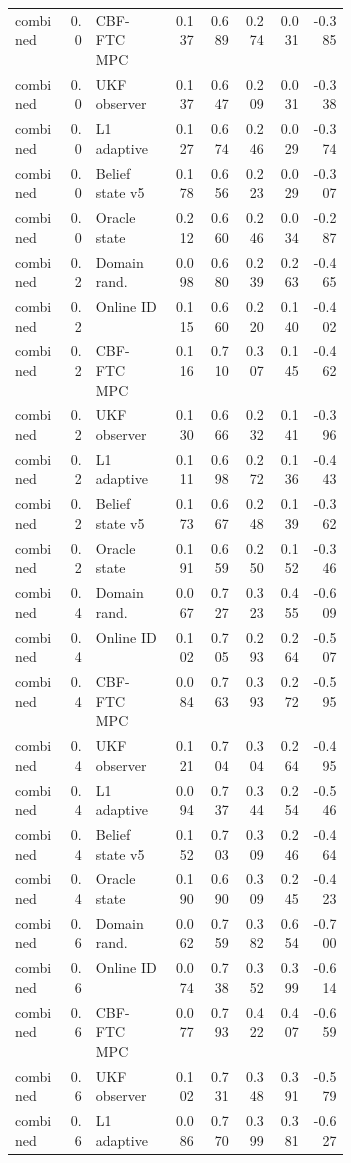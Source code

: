 \documentclass{article}
\begin{document}
\begin{center}
\begin{longtable}{p{0.16\linewidth}rp{0.23\linewidth}rrrrr}
combined & 0.0 & CBF-FTC MPC & 0.137 & 0.689 & 0.274 & 0.031 & -0.385\\
combined & 0.0 & UKF observer & 0.137 & 0.647 & 0.209 & 0.031 & -0.338\\
combined & 0.0 & L1 adaptive & 0.127 & 0.674 & 0.246 & 0.029 & -0.374\\
combined & 0.0 & Belief state v5 & 0.178 & 0.656 & 0.223 & 0.029 & -0.307\\
combined & 0.0 & Oracle state & 0.212 & 0.660 & 0.246 & 0.034 & -0.287\\
combined & 0.2 & Domain rand. & 0.098 & 0.680 & 0.239 & 0.263 & -0.465\\
combined & 0.2 & Online ID & 0.115 & 0.660 & 0.220 & 0.140 & -0.402\\
combined & 0.2 & CBF-FTC MPC & 0.116 & 0.710 & 0.307 & 0.145 & -0.462\\
combined & 0.2 & UKF observer & 0.130 & 0.666 & 0.232 & 0.141 & -0.396\\
combined & 0.2 & L1 adaptive & 0.111 & 0.698 & 0.272 & 0.136 & -0.443\\
combined & 0.2 & Belief state v5 & 0.173 & 0.667 & 0.248 & 0.139 & -0.362\\
combined & 0.2 & Oracle state & 0.191 & 0.659 & 0.250 & 0.152 & -0.346\\
combined & 0.4 & Domain rand. & 0.067 & 0.727 & 0.323 & 0.455 & -0.609\\
combined & 0.4 & Online ID & 0.102 & 0.705 & 0.293 & 0.264 & -0.507\\
combined & 0.4 & CBF-FTC MPC & 0.084 & 0.763 & 0.393 & 0.272 & -0.595\\
combined & 0.4 & UKF observer & 0.121 & 0.704 & 0.304 & 0.264 & -0.495\\
combined & 0.4 & L1 adaptive & 0.094 & 0.737 & 0.344 & 0.254 & -0.546\\
combined & 0.4 & Belief state v5 & 0.152 & 0.703 & 0.309 & 0.246 & -0.464\\
combined & 0.4 & Oracle state & 0.190 & 0.690 & 0.309 & 0.245 & -0.423\\
combined & 0.6 & Domain rand. & 0.062 & 0.759 & 0.382 & 0.654 & -0.700\\
combined & 0.6 & Online ID & 0.074 & 0.738 & 0.352 & 0.399 & -0.614\\
combined & 0.6 & CBF-FTC MPC & 0.077 & 0.793 & 0.422 & 0.407 & -0.659\\
combined & 0.6 & UKF observer & 0.102 & 0.731 & 0.348 & 0.391 & -0.579\\
combined & 0.6 & L1 adaptive & 0.086 & 0.770 & 0.399 & 0.381 & -0.627\\

\end{longtable}
\end{center}
\end{document}
